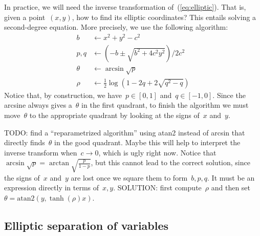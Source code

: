 In practice, we will need the inverse transformation
of~(\ref{eq:elliptic}).  That is, given a point~$(x,y)$, how to
find its elliptic coordinates?  This entails solving a second-degree
equation.  More precisely, we use the following algorithm:
\begin{align*}
	b   & \leftarrow x^2+y^2-c^2 \\
	p,q & \leftarrow \left(-b\pm\sqrt{b^2+4c^2y^2}\right)/{2c^2} \\
	\theta & \leftarrow \arcsin\sqrt{p} \\
	\rho & \leftarrow  \frac12\log\left(1-2q+2\sqrt{q^2-q}\right)
\end{align*}
Notice that, by construction, we have~$p\in[0,1]$ and~$q\in[-1,0]$.
Since the arcsine
always gives a~$\theta$ in the first quadrant, to finish the
algorithm we must move~$\theta$ to the appropriate quadrant by
looking at the signs of~$x$ and~$y$.

TODO: find a ``reparametrized algorithm'' using atan2 instead of
arcsin that directly finds~$\theta$ in the good quadrant.  Maybe this
will help to interpret the inverse transform when~$c\to0$, which is
ugly right now.  Notice that~$\arcsin\sqrt
p=\arctan\sqrt{\frac{p}{1-p}}$, but this cannot lead to the correct
solution, since the signs of~$x$ and~$y$ are lost once we square
them to form~$b,p,q$.  It must be an expression directly in terms
of~$x,y$.  SOLUTION: first compute~$\rho$ and then
set~$\theta=\mathrm{atan2}\left(y,\tanh(\rho) x\right)$.

\subsection{Elliptic separation of variables}

